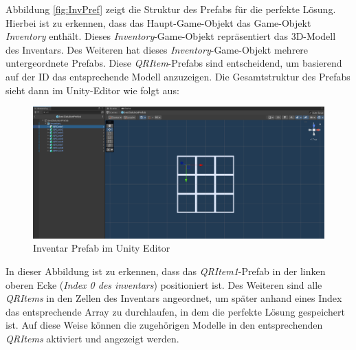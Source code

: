 Abbildung \ref{fig:InvPref} zeigt die Struktur des Prefabs für die perfekte Lösung. Hierbei ist zu erkennen, dass das
Haupt-Game-Objekt das Game-Objekt \textit{Inventory} enthält. Dieses \textit{Inventory}-Game-Objekt repräsentiert das
3D-Modell des Inventars. Des Weiteren hat dieses \textit{Inventory}-Game-Objekt mehrere untergeordnete Prefabs. Diese
\textit{QRItem}-Prefabs sind entscheidend, um basierend auf der ID das entsprechende Modell anzuzeigen. Die Gesamtstruktur
des Prefabs sieht dann im Unity-Editor wie folgt aus:
\begin{figure}[h]
    \centering
    \includegraphics[scale=0.3]{images/prefShow}
    \caption{Inventar Prefab im Unity Editor}
    \label{fig:InvPrefUn}
\end{figure}
In dieser Abbildung ist zu erkennen, dass das \textit{QRItem1}-Prefab in der linken oberen Ecke (\textit{Index 0 des inventars})
positioniert ist. Des Weiteren sind alle \textit{QRItems} in den Zellen des Inventars angeordnet, um später anhand eines
Index das entsprechende Array zu durchlaufen, in dem die perfekte Lösung gespeichert ist. Auf diese Weise können die
zugehörigen Modelle in den entsprechenden \textit{QRItems} aktiviert und angezeigt werden.

